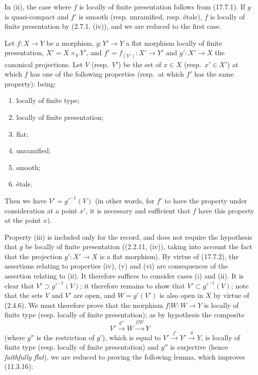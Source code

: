 In (ii), the case where $f$ is locally of finite presentation follows from (17.7.1). If $g$ is quasi-compact and $f'$ is smooth (resp. unramified, resp. étale), $f$ is locally of finite presentation by (2.7.1, (iv)), and we are reduced to the first case.

\begin{proposition}[17.7.4]
\label{IV.17.7.4}
Let $f:X\to Y$ be a morphism, $g:Y'\to Y$ a flat morphism locally of finite presentation, $X'=X\times_Y Y'$, and $f'=f_{(Y')}:X'\to Y'$ and $g':X'\to X$ the
canonical projections. Let $V$ \textup{(resp.}\ $V'$\textup{)} be the set of $x\in X$ \textup{(resp.}\ $x'\in X'$\textup{)} at which $f$ has one of the following properties \textup{(resp.}\ at which $f'$ has the same property\textup{)}: being:
\begin{enumerate}
  \item[\textup{(i)}] locally of finite type;
  \item[\textup{(ii)}] locally of finite presentation;
  \item[\textup{(iii)}] flat;
  \item[\textup{(iv)}] unramified;
  \item[\textup{(v)}] smooth;
  \item[\textup{(vi)}] étale.
\end{enumerate}
Then we have $V'=g'^{-1}(V)$ \textup{(in other words, for $f'$ to have the property under consideration at a point $x'$, it is necessary and sufficient that $f$ have this property at the point $x$)}.
\end{proposition}

Property (iii) is included only for the record, and does not require the hypothesis that $g$ be locally of finite presentation ((2.2.11, (iv)), taking into account the fact that the projection $g':X'\to X$ is a flat morphism). By virtue of (17.7.2), the assertions relating to properties (iv), (v) and (vi) are consequences of the assertion relating to (ii). It therefore suffices to consider cases (i) and (ii). It is clear that $V'\supset g'^{-1}(V)$; it therefore remains to show that $V'\subset g'^{-1}(V)$; note that the sets $V$ and $V'$ are open, and $W=g'(V')$ is also open in $X$ by virtue of (2.4.6). We must therefore prove that the morphism $f|W:W\to Y$ is locally of finite type (resp. locally of finite presentation); as by hypothesis the composite
\[
V'\xrightarrow{g''}W\xrightarrow{f|W}Y
\]
(where $g''$ is the restriction of $g'$), which is equal to $V'\xrightarrow{f'}Y'\xrightarrow{g}Y$, is locally of finite type (resp. locally of finite presentation) and $g''$ is surjective (hence \emph{faithfully flat}), we are reduced to proving the following lemma, which improves (11.3.16):

